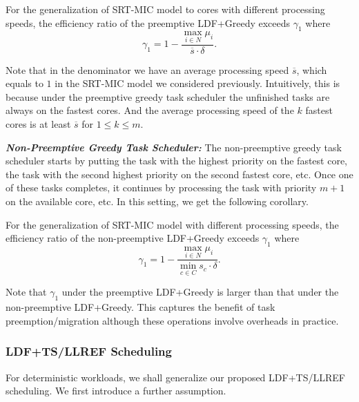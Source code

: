 \documentclass[prodmode,acmtompecs]{acmsmall}
\newcommand{\fullUserSet}{N}
\newcommand{\myComments}[1]{}
\newif\iftompecsonly
\newif\iftompecsextended
\newcommand{\tompecsonlyStart}{\iftompecsonly \myComments{TOMPECS only version: }}
\newcommand{\tompecsextendedStart}{\iftompecsextended  \myComments{TOMPECS extended version: }}
\newcommand{\commentEnd}{\myComments{End}}
\begin{document}
\begin{corollary}
\label{corollary_gamma1_diff_speed_pre}
For the generalization of SRT-MIC model to cores with different processing speeds, the efficiency ratio of the preemptive LDF+Greedy exceeds $\gamma_1$ where
$$
\gamma_1 = 1 - \frac{\max\limits_{i \in \fullUserSet} \mu_i}{\overline{s} \cdot \delta}. 
$$
\end{corollary}

Note that in the denominator we have an average processing speed $\overline{s}$, which equals to $1$ in the SRT-MIC model we considered previously. 
Intuitively, this is because under the preemptive greedy task scheduler the unfinished tasks are always on the fastest cores. And the average processing speed of the $k$ fastest cores is at least $\overline{s}$ for $1\leq k \leq m$. 
\tompecsonlyStart
We omit the proof to save space. For a detailed proof, see the extended version of this paper \cite{EXT}. 
\commentEnd\fi
\tompecsextendedStart
Refer to Appendix \ref{appendix_pf_gamma1_diff_speed_pre} for the proof. 
\commentEnd\fi

{\bf \em Non-Preemptive Greedy Task Scheduler: }
The non-preemptive greedy task scheduler starts by putting the task with the highest priority on the fastest core, the task with the second highest priority on the second fastest core, etc. Once one of these tasks completes, it continues by processing the task with priority $m+1$ on the available core, etc. In this setting, we get the following corollary. 

\begin{corollary}
\label{corollary_gamma1_diff_speed_nonpre}
For the generalization of SRT-MIC model with different processing speeds, the efficiency ratio of the non-preemptive LDF+Greedy exceeds $\gamma_1$ where
$$
\gamma_1 = 1 - \frac{\max\limits_{i \in \fullUserSet} \mu_i}{\min\limits_{c \in C} s_c \cdot \delta}. 
$$
\end{corollary}
\tompecsonlyStart
\noindent See the extended version of this paper \cite{EXT} for the proof. 
\commentEnd\fi
\tompecsextendedStart
\noindent See Appendix \ref{appendix_pf_gamma1_diff_speed_nonpre} for the proof. 
\commentEnd\fi

Note that $\gamma_1$ under the preemptive LDF+Greedy is larger than that under the non-preemptive LDF+Greedy. This captures the benefit of task preemption/migration although these operations involve overheads in practice. 

\subsubsection{LDF+TS/LLREF Scheduling}
For deterministic workloads, we shall generalize our proposed LDF+TS/LLREF scheduling. We first introduce a further assumption. 
\end{document}
